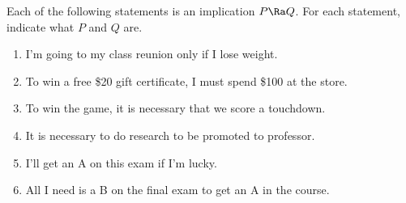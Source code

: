 \documentclass{homework}
\begin{document}

\question Each of the following statements is an implication $P \Ra Q$. For each statement, indicate what $P$ and $Q$ are.
\begin{enumerate}[label=(\alph*)]
    \item I'm going to my class reunion only if I lose weight.


    \item To win a free \$20 gift certificate, I must spend \$100 at the store.


    \item To win the game, it is necessary that we score a touchdown.


    \item It is necessary to do research to be promoted to professor.


    \item I’ll get an A on this exam if I’m lucky.


    \item All I need is a B on the final exam to get an A in the course.

\end{enumerate}
\end{document}
